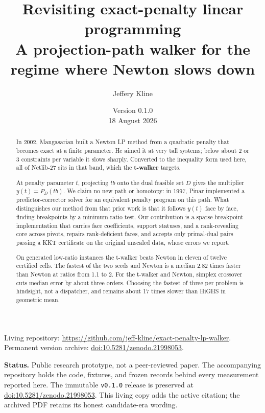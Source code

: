 \documentclass[11pt]{article}
\title{Revisiting exact-penalty linear programming\\
       \large A projection-path walker for the regime where Newton slows down}
\author{Jeffery Kline}
\date{Version 0.1.0\\18 August 2026}
\newcommand{\method}[1]{\textbf{#1}}
\newcommand{\code}[1]{\texttt{#1}}
\begin{document}
\maketitle

\begin{center}
\small Living repository: \url{https://github.com/jeff-kline/exact-penalty-lp-walker}.\\
Permanent version archive: \href{https://doi.org/10.5281/zenodo.21998053}{doi:10.5281/zenodo.21998053}.
\end{center}

\begin{abstract}
In 2002, Mangasarian built a Newton LP method from a quadratic penalty that
becomes exact at a finite parameter. He aimed it at very tall systems; below
about 2 or 3 constraints per variable it slows sharply. Converted to the
inequality form used here, all of Netlib-27 sits in that band, which the
\method{t-walker} targets.

At penalty parameter $t$, projecting $tb$ onto the dual feasible set $D$ gives
the multiplier $y(t)=P_D(tb)$. We claim no new path or homotopy: in 1997, Pinar
implemented a predictor-corrector solver for an equivalent penalty program on
this path. What distinguishes our method from that prior work is that it follows
$y(t)$ face by face, finding breakpoints by a minimum-ratio test. Our
contribution is a sparse breakpoint implementation that carries face
coefficients, support statuses, and a rank-revealing core across pivots, repairs
rank-deficient faces, and accepts only primal-dual pairs passing a KKT
certificate on the original unscaled data, whose errors we report.

On generated low-ratio instances the t-walker beats Newton in eleven of twelve
certified cells. The fastest of the two seeds and Newton is a median 2.82 times
faster than Newton at ratios from 1.1 to 2. For the t-walker and Newton, simplex
crossover cuts median error by about three
orders. Choosing the fastest of three per problem is hindsight, not a
dispatcher, and remains about 17 times slower than HiGHS in geometric mean.
\end{abstract}

\medskip
\noindent\textbf{Status.} Public research prototype, not a peer-reviewed paper.
The accompanying repository holds the code, fixtures, and frozen records behind
every measurement reported here. The immutable \code{v0.1.0} release is
preserved at \href{https://doi.org/10.5281/zenodo.21998053}{doi:10.5281/zenodo.21998053}.
This living copy adds the active citation; the archived PDF retains its honest
candidate-era wording.
\end{document}
